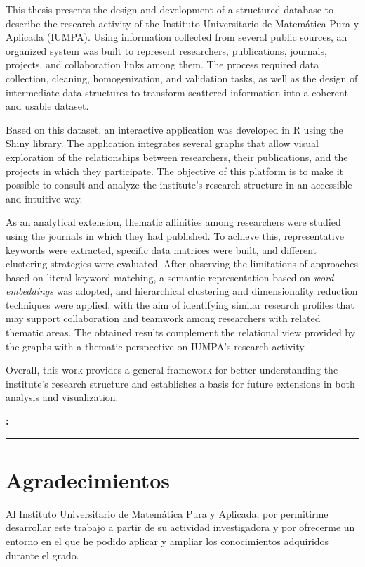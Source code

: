 \documentclass[11pt,spanish,listoffigures,listoftables]{tfgetsinf}
\renewenvironment{abstract}[1][catalan]{%
    \begingroup
    \selectlanguage{#1}\vspace{1em}\par\hfill
    {\sffamily\bfseries\Huge\abstractname}\par
    \vspace{0.5em}
}{%
    \par\noindent\textbf{\keywordsname:} \keywords
    \vspace{0.5em}
    \hrule
    \vspace{1em}
    \endgroup
}
\begin{document}
\begin{abstract}[english]
This thesis presents the design and development of a structured database to describe the research activity of the Instituto Universitario de Matemática Pura y Aplicada (IUMPA). Using information collected from several public sources, an organized system was built to represent researchers, publications, journals, projects, and collaboration links among them. The process required data collection, cleaning, homogenization, and validation tasks, as well as the design of intermediate data structures to transform scattered information into a coherent and usable dataset.

Based on this dataset, an interactive application was developed in R using the Shiny library. The application integrates several graphs that allow visual exploration of the relationships between researchers, their publications, and the projects in which they participate. The objective of this platform is to make it possible to consult and analyze the institute's research structure in an accessible and intuitive way.

As an analytical extension, thematic affinities among researchers were studied using the journals in which they had published. To achieve this, representative keywords were extracted, specific data matrices were built, and different clustering strategies were evaluated. After observing the limitations of approaches based on literal keyword matching, a semantic representation based on \textit{word embeddings} was adopted, and hierarchical clustering and dimensionality reduction techniques were applied, with the aim of identifying similar research profiles that may support collaboration and teamwork among researchers with related thematic areas. The obtained results complement the relational view provided by the graphs with a thematic perspective on IUMPA's research activity.

Overall, this work provides a general framework for better understanding the institute's research structure and establishes a basis for future extensions in both analysis and visualization.
\end{abstract}

\cleardoublepage

\chapter*{Agradecimientos}

Al Instituto Universitario de Matemática Pura y Aplicada, por permitirme desarrollar este trabajo a partir de su actividad investigadora y por ofrecerme un entorno en el que he podido aplicar y ampliar los conocimientos adquiridos durante el grado. 
\end{document}

